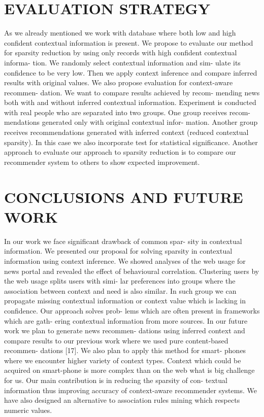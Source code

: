 \documentclass{acm_proc_article-sp} %
\begin{document}
\section{EVALUATION STRATEGY}
As we already mentioned we work with database where
both low and high confident contextual information is present.
We propose to evaluate our method for sparsity reduction by
using only records with high confident contextual informa-
tion. We randomly select contextual information and sim-
ulate its confidence to be very low. Then we apply context
inference and compare inferred results with original values.
We also propose evaluation for context-aware recommen-
dation. We want to compare results achieved by recom-
mending news both with and without inferred contextual
information. Experiment is conducted with real people who
are separated into two groups. One group receives recom-
mendations generated only with original contextual infor-
mation. Another group receives recommendations generated
with inferred context (reduced contextual sparsity). In this
case we also incorporate test for statistical significance.
Another approach to evaluate our approach to sparsity
reduction is to compare our recommender system to others
to show expected improvement.

\section{CONCLUSIONS AND FUTURE WORK} 
In our work we face significant drawback of common spar-
sity in contextual information. We presented our proposal
for solving sparsity in contextual information using context
inference. We showed analyses of the web usage for news
portal and revealed the effect of behavioural correlation.
Clustering users by the web usage splits users with simi-
lar preferences into groups where the association between
context and need is also similar. In such group we can
propagate missing contextual information or context value
which is lacking in confidence. Our approach solves prob-
lems which are often present in frameworks which are gath-
ering contextual information from more sources.
In our future work we plan to generate news recommen-
dations using inferred context and compare results to our
previous work where we used pure content-based recommen-
dations [17]. We also plan to apply this method for smart-
phones where we encounter higher variety of context types.
Context which could be acquired on smart-phone is more
complex than on the web what is big challenge for us.
Our main contribution is in reducing the sparsity of con-
textual information thus improving accuracy of context-aware
recommender systems. We have also designed an alternative
to association rules mining which respects numeric values.
\end{document}
